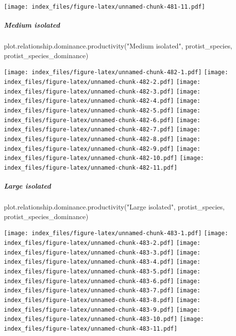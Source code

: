 \documentclass[
]{article}
\newenvironment{Shaded}{\begin{snugshade}}{\end{snugshade}}
\newcommand{\FunctionTok}[1]{\textcolor[rgb]{0.00,0.00,0.00}{#1}}
\newcommand{\NormalTok}[1]{#1}
\newcommand{\StringTok}[1]{\textcolor[rgb]{0.31,0.60,0.02}{#1}}
\begin{document}
\texttt{[image: index\_files/figure-latex/unnamed-chunk-481-11.pdf]}

\hypertarget{medium-isolated-3}{%
\subparagraph{Medium isolated}\label{medium-isolated-3}}

\begin{Shaded}
\begin{Highlighting}[]
\FunctionTok{plot.relationship.dominance.productivity}\NormalTok{(}\StringTok{"Medium isolated"}\NormalTok{,}
\NormalTok{                                         protist\_species,}
\NormalTok{                                         protist\_species\_dominance)}
\end{Highlighting}
\end{Shaded}

\texttt{[image: index\_files/figure-latex/unnamed-chunk-482-1.pdf]}
\texttt{[image: index\_files/figure-latex/unnamed-chunk-482-2.pdf]}
\texttt{[image: index\_files/figure-latex/unnamed-chunk-482-3.pdf]}
\texttt{[image: index\_files/figure-latex/unnamed-chunk-482-4.pdf]}
\texttt{[image: index\_files/figure-latex/unnamed-chunk-482-5.pdf]}
\texttt{[image: index\_files/figure-latex/unnamed-chunk-482-6.pdf]}
\texttt{[image: index\_files/figure-latex/unnamed-chunk-482-7.pdf]}
\texttt{[image: index\_files/figure-latex/unnamed-chunk-482-8.pdf]}
\texttt{[image: index\_files/figure-latex/unnamed-chunk-482-9.pdf]}
\texttt{[image: index\_files/figure-latex/unnamed-chunk-482-10.pdf]}
\texttt{[image: index\_files/figure-latex/unnamed-chunk-482-11.pdf]}

\hypertarget{large-isolated-3}{%
\subparagraph{Large isolated}\label{large-isolated-3}}

\begin{Shaded}
\begin{Highlighting}[]
\FunctionTok{plot.relationship.dominance.productivity}\NormalTok{(}\StringTok{"Large isolated"}\NormalTok{,}
\NormalTok{                                         protist\_species,}
\NormalTok{                                         protist\_species\_dominance)}
\end{Highlighting}
\end{Shaded}

\texttt{[image: index\_files/figure-latex/unnamed-chunk-483-1.pdf]}
\texttt{[image: index\_files/figure-latex/unnamed-chunk-483-2.pdf]}
\texttt{[image: index\_files/figure-latex/unnamed-chunk-483-3.pdf]}
\texttt{[image: index\_files/figure-latex/unnamed-chunk-483-4.pdf]}
\texttt{[image: index\_files/figure-latex/unnamed-chunk-483-5.pdf]}
\texttt{[image: index\_files/figure-latex/unnamed-chunk-483-6.pdf]}
\texttt{[image: index\_files/figure-latex/unnamed-chunk-483-7.pdf]}
\texttt{[image: index\_files/figure-latex/unnamed-chunk-483-8.pdf]}
\texttt{[image: index\_files/figure-latex/unnamed-chunk-483-9.pdf]}
\texttt{[image: index\_files/figure-latex/unnamed-chunk-483-10.pdf]}
\texttt{[image: index\_files/figure-latex/unnamed-chunk-483-11.pdf]}
\end{document}
